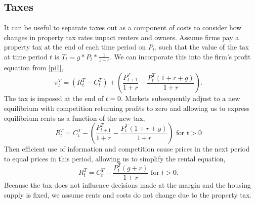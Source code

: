 \documentclass[ecta,nameyear,draft]{econsocart}
\theoremstyle{plain}
\theoremstyle{remark}
\begin{document}
\subsection{Taxes}
It can be useful to separate taxes out as a component of costs to consider how changes in property tax rates impact renters and owners. Assume firms pay a property tax at the end of each time period on $P_{t}$, such that the value of the tax at time period $t$ is $T_t=g*P_{t}*\frac{1}{1+r}$. We can incorporate this into the firm's profit equation from \ref{pi1},
\begin{equation*}
	\pi^T_t = (R^T_t-C^T_t)+\left(\frac{P^T_{t+1}}{1+r}-\frac{P^T_t(1+r+g)}{1+r}\right).\label{pi1T}
\end{equation*}
The tax is imposed at the end of $t=0$. Markets subsequently adjust to a new equilibrium with competition returning profits to zero and allowing us to express equilibrium rents as a function of the new tax,
\begin{equation*}
	R^T_t=C^T_t-\left(\frac{P^T_{t+1}}{1+r}-\frac{P^T_t(1+r+g)}{1+r}\right) \text{ for }t>0
\end{equation*}
Then efficient use of information and competition cause prices in the next period to equal prices in this period, allowing us to simplify the rental equation,
\begin{equation*}
R^T_t=C^T_t-\frac{P^T_{t}(g+r)}{1+r}\text{ for }t>0.
\end{equation*}
Because the tax does not influence decisions made at the margin and the housing supply is fixed, we assume rents and costs do not change due to the property tax. 
\end{document}
